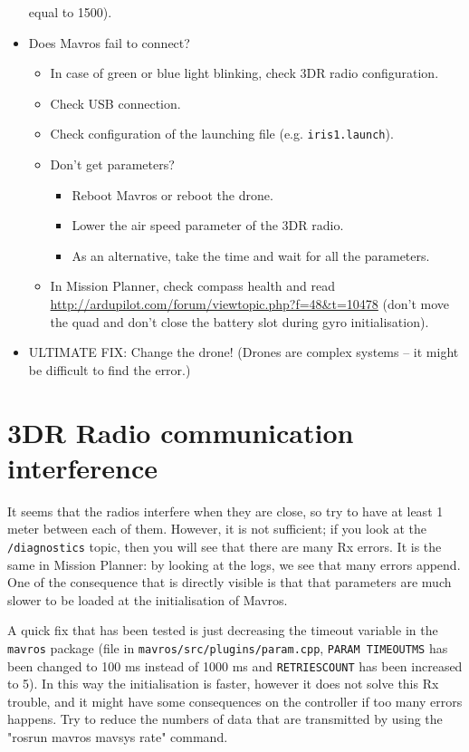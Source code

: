\documentclass[titlepage,11pt,a4paper]{article}
\begin{document}
\begin{appendices}
\begin{itemize}
    equal to 1500).
  \item Does Mavros fail to connect?
    \begin{itemize}
      \item In case of green or blue light blinking, check 3DR radio
        configuration.
      \item Check USB connection.
      \item Check configuration of the launching file (e.g. \texttt{iris1.launch}).
      \item Don't get parameters?
        \begin{itemize}
          \item Reboot Mavros or reboot the drone.
          \item Lower the air speed parameter of the 3DR radio.
          \item As an alternative, take the time and wait for all the
            parameters.
        \end{itemize}
      \item In Mission Planner, check compass health and read
        \url{http://ardupilot.com/forum/viewtopic.php?f=48&t=10478}
        (don't move the quad and don't close the battery slot during gyro
        initialisation).
    \end{itemize}
  \item ULTIMATE FIX: Change the drone! (Drones are complex systems -- it
    might be difficult to find the error.)
\end{itemize}
    
\section{3DR Radio communication interference}
It seems that the radios interfere when they are close, so try to have
at least 1 meter between each of them.  However, it is not sufficient;
if you look at the \texttt{/diagnostics} topic, then you will see that
there are many Rx errors. It is the same in Mission Planner: by
looking at the logs, we see that many errors append. One of the
consequence that is directly visible is that that parameters are much
slower to be loaded at the initialisation of Mavros.

A quick fix that has been tested is just decreasing the timeout variable in
the \texttt{mavros} package (file in
\texttt{mavros/src/plugins/param.cpp}, \texttt{PARAM\textunderscore
  TIMEOUT\textunderscore MS} has been changed to 100 ms instead of
1000 ms and \texttt{RETRIES\textunderscore COUNT} has been increased
to 5). In this way the initialisation is faster, however it does not
solve this Rx trouble, and it might have some consequences on the
controller if too many errors happens.  Try to reduce the numbers of
data that are transmitted by using the "rosrun mavros mavsys rate"
command.


\end{appendices}
\end{document}
